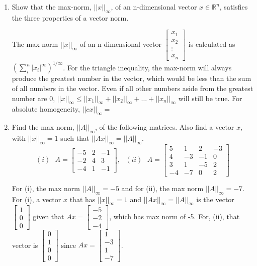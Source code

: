 \documentclass[10pt,letterpaper]{article}
\begin{document}
\begin{enumerate}

\item Show that the max-norm, $||x||_{\infty}$, of an n-dimensional vector $x \in \mathbb{R}^{n}$, satisfies the three properties of a vector norm.

\color{TangGreen}
The max-norm $||x||_{\infty}$ of an n-dimensional vector $\begin{bmatrix}
x_{1} \\
x_{2} \\
\vdots \\
x_{n}
\end{bmatrix}$ is calculated as $\left( \sum_{i}^{n} |x_{i}|^{\infty} \right)^{1/\infty}$. For the triangle inequality, the max-norm will always produce the greatest number in the vector, which would be less than the sum of all numbers in the vector. Even if all other numbers aside from the greatest number are 0, $||x||_{\infty} \leq ||x_{1}||_{\infty} + ||x_{2}||_{\infty} + \dots + ||x_{n}||_{\infty}$ will still be true. For absolute homogeneity, $||cx||_{\infty} = $
\color{black}

\item Find the max norm, $||A||_{\infty}$, of the following matrices. Also find a vector $x$, with $||x||_{\infty} = 1$ such that $||Ax||_{\infty} = ||A||_{\infty}$. 
$$(i)\ \ \ A = \begin{bmatrix}
-5 & 2 & -1 \\
-2 & 4 & 3 \\
-4 & 1 & -1 
\end{bmatrix},\ \ \ (ii)\ \ \ A = \begin{bmatrix}
5 & 1 & 2 & -3 \\
4 & -3 & -1 & 0 \\
3 & 1 & -5 & 2 \\
-4 & -7 & 0 & 2 
\end{bmatrix}$$ 

\color{TangGreen}
For (i), the max norm $||A||_{\infty} = -5$ and for (ii), the max norm $||A||_{\infty} = -7$. For (i), a vector $x$ that has $||x||_{\infty} = 1$ and $||Ax||_{\infty} = ||A||_{\infty}$ is the vector $\begin{bmatrix}
1 \\
0 \\
0 
\end{bmatrix}$ given that $Ax = \begin{bmatrix}
-5 \\
-2 \\
-4 
\end{bmatrix}$, which has max norm of -5. For, (ii), that vector is $\begin{bmatrix}
0 \\
1 \\
0 \\
0 
\end{bmatrix}$ since $Ax = \begin{bmatrix}
1 \\
-3 \\
1 \\
-7 
\end{bmatrix}$. 
\color{black}


\end{enumerate}
\end{document}
